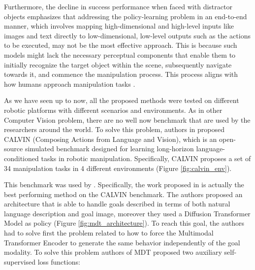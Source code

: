 \newline Furthermore, the decline in success performance when faced with distractor objects emphasizes that addressing the policy-learning problem in an end-to-end manner, which involves mapping high-dimensional and high-level inputs like images and text directly to low-dimensional, low-level outputs such as the actions to be executed, may not be the most effective approach. This is because such models might lack the necessary perceptual components that enable them to initially recognize the target object within the scene, subsequently navigate towards it, and commence the manipulation process. This process aligns with how humans approach manipulation tasks \cite{grill2003neural}.


As we have seen up to now, all the proposed methods were tested on different robotic platforms with different scenarios and environments. As in other Computer Vision problem, there are no well now benchmark that are used by the researchers around the world. To solve this problem, authors in \cite{mees2022calvin} proposed CALVIN (Composing Actions from Language and Vision), which is an open-source simulated benchmark designed for learning long-horizon language-conditioned tasks in robotic manipulation. Specifically, CALVIN proposes a set of 34 manipulation tasks in 4 different environments (Figure \ref{fig:calvin_env}). 

This benchmark was used by \cite{mees2022hulc,mees2023hulc++,reuss2024multimodal}. Specifically, the work proposed in \cite{reuss2024multimodal} is actually the best performing method on the CALVIN benchmark. The authors proposed an architecture that is able to handle goals described in terms of both natural language description and goal image, moreover they used a Diffusion Transformer Model as policy (Figure \ref{fig:mdt_architecture}). To reach this goal, the authors had to solve first the problem related to how to force the Multimodal Transformer Encoder to generate the same behavior independently of the goal modality. To solve this problem authors of MDT proposed two auxiliary self-supervised loss functions:

